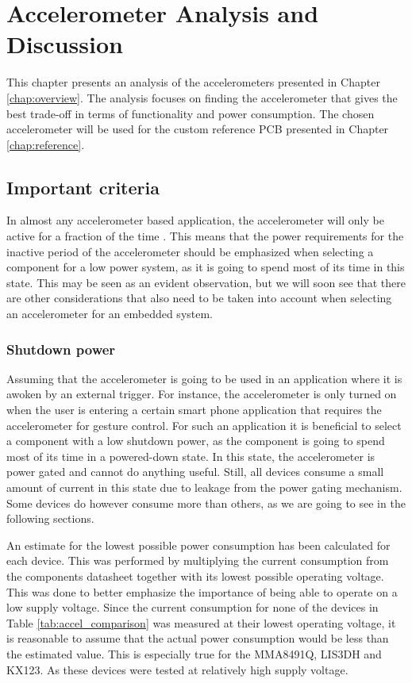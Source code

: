\chapter{Accelerometer Analysis and Discussion}
\label{chap:analysis}

This chapter presents an analysis of the accelerometers presented in Chapter \ref{chap:overview}. The analysis focuses on finding the accelerometer that gives the best trade-off in terms of functionality and power consumption. The chosen accelerometer will be used for the custom reference PCB presented in Chapter \ref{chap:reference}.

\section{Important criteria}

In almost any accelerometer based application, the accelerometer will only be active for a fraction of the time \cite{moldsvor15}. This means that the power requirements for the inactive period of the accelerometer should be emphasized when selecting a component for a low power system, as it is going to spend most of its time in this state. This may be seen as an evident observation, but we will soon see that there are other considerations that also need to be taken into account when selecting an accelerometer for an embedded system.

\subsection{Shutdown power}

Assuming that the accelerometer is going to be used in an application where it is awoken by an external trigger. For instance, the accelerometer is only turned on when the user is entering a certain smart phone application that requires the accelerometer for gesture control. For such an application it is beneficial to select a component with a low shutdown power, as the component is going to spend most of its time in a powered-down state. In this state, the accelerometer is power gated and cannot do anything useful. Still, all devices consume a small amount of current in this state due to leakage from the power gating mechanism. Some devices do however consume more than others, as we are going to see in the following sections.  

An estimate for the lowest possible power consumption has been calculated for each device. This was performed by multiplying the current consumption from the components datasheet together with its lowest possible operating voltage. This was done to better emphasize the importance of being able to operate on a low supply voltage. Since the current consumption for none of the devices in Table \ref{tab:accel_comparison} was measured at their lowest operating voltage, it is reasonable to assume that the actual power consumption would be less than the estimated value. This is especially true for the MMA8491Q, LIS3DH and KX123. As these devices were tested at relatively high supply voltage. 

